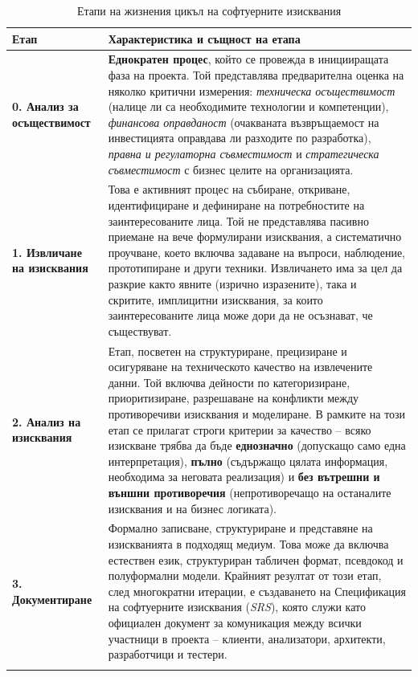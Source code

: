 \documentclass{scrartcl}
\begin{document}
\begin{FlushLeft}
\begin{table}[H]
\centering
\caption{Етапи на жизнения цикъл на софтуерните изисквания}
\vspace{2mm}
\small
\begin{tabularx}{\textwidth}{p{2.4cm} X}
\toprule
\textbf{Етап} & \textbf{Характеристика и същност на етапа} \\
\midrule
\textbf{0. Анализ за осъществимост} & \textbf{Еднократен процес}, който се провежда в иницииращата фаза на проекта. Той представлява предварителна оценка на няколко критични измерения: \textit{техническа осъществимост} (налице ли са необходимите технологии и компетенции), \textit{финансова оправданост} (очакваната възвръщаемост на инвестицията оправдава ли разходите по разработка), \textit{правна и регулаторна съвместимост} и \textit{стратегическа съвместимост} с бизнес целите на организацията. \\ \addlinespace
\textbf{1. Извличане на изисквания} & Това е активният процес на събиране, откриване, идентифициране и дефиниране на потребностите на заинтересованите лица. Той не представлява пасивно приемане на вече формулирани изисквания, а систематично проучване, което включва задаване на въпроси, наблюдение, прототипиране и други техники. Извличането има за цел да разкрие както явните (изрично изразените), така и скритите, имплицитни изисквания, за които заинтересованите лица може дори да не осъзнават, че съществуват. \\ \addlinespace
\textbf{2. Анализ на изисквания} & Етап, посветен на структуриране, прецизиране и осигуряване на техническото качество на извлечените данни. Той включва дейности по категоризиране, приоритизиране, разрешаване на конфликти между противоречиви изисквания и моделиране. В рамките на този етап се прилагат строги критерии за качество -- всяко изискване трябва да бъде \textbf{еднозначно} (допускащо само една интерпретация), \textbf{пълно} (съдържащо цялата информация, необходима за неговата реализация) и \textbf{без вътрешни и външни противоречия} (непротиворечащо на останалите изисквания и на бизнес логиката). \\ \addlinespace
\textbf{3. Документиране} & Формално записване, структуриране и представяне на изискванията в подходящ медиум. Това може да включва естествен език, структуриран табличен формат, псевдокод и полуформални модели. Крайният резултат от този етап, след многократни итерации, е създаването на Спецификация на софтуерните изисквания (\textit{SRS}), която служи като официален документ за комуникация между всички участници в проекта -- клиенти, анализатори, архитекти, разработчици и тестери. \\ \addlinespace

\end{tabularx}
\end{table}
\end{FlushLeft}
\end{document}
